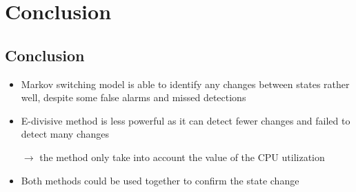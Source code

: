 \documentclass{beamer}
\begin{document}
\begin{frame}[fragile]

\end{frame}


\section{Conclusion}
\subsection{Conclusion}
\begin{frame}
\begin{itemize}
	\item Markov switching model is able to identify any changes between states rather well, despite some false alarms and missed detections
	\item E-divisive method  is less powerful as it can detect fewer changes and failed to detect many changes
	
	$\rightarrow$ the method only take into account the value of the CPU utilization
	
	\item Both methods could be used together to confirm the state change
\end{itemize}
\end{frame}
\end{document}
